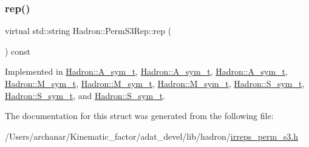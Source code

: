 \mbox{\label{structHadron_1_1PermS3Rep_a4f22ded21fbb16c6b7dc3d729090ef4f}} 
\subsubsection{\texorpdfstring{rep()}{rep()}\hspace{0.1cm}{\footnotesize\ttfamily [2/2]}}
{\footnotesize\ttfamily virtual std\+::string Hadron\+::\+Perm\+S3\+Rep\+::rep (\begin{DoxyParamCaption}{ }\end{DoxyParamCaption}) const\hspace{0.3cm}{\ttfamily [pure virtual]}}



Implemented in \mbox{\hyperlink{structHadron_1_1A__sym__t_ac60fe125eeb713995aafa4712e23f919}{Hadron\+::\+A\+\_\+sym\+\_\+t}}, \mbox{\hyperlink{structHadron_1_1A__sym__t_ac60fe125eeb713995aafa4712e23f919}{Hadron\+::\+A\+\_\+sym\+\_\+t}}, \mbox{\hyperlink{structHadron_1_1A__sym__t_ac60fe125eeb713995aafa4712e23f919}{Hadron\+::\+A\+\_\+sym\+\_\+t}}, \mbox{\hyperlink{structHadron_1_1M__sym__t_ad90bc816709bb65ec3e0b804090fbefe}{Hadron\+::\+M\+\_\+sym\+\_\+t}}, \mbox{\hyperlink{structHadron_1_1M__sym__t_ad90bc816709bb65ec3e0b804090fbefe}{Hadron\+::\+M\+\_\+sym\+\_\+t}}, \mbox{\hyperlink{structHadron_1_1M__sym__t_ad90bc816709bb65ec3e0b804090fbefe}{Hadron\+::\+M\+\_\+sym\+\_\+t}}, \mbox{\hyperlink{structHadron_1_1S__sym__t_a1a8ccb60f6d70c9a00b8683ad8eac195}{Hadron\+::\+S\+\_\+sym\+\_\+t}}, \mbox{\hyperlink{structHadron_1_1S__sym__t_a1a8ccb60f6d70c9a00b8683ad8eac195}{Hadron\+::\+S\+\_\+sym\+\_\+t}}, and \mbox{\hyperlink{structHadron_1_1S__sym__t_a1a8ccb60f6d70c9a00b8683ad8eac195}{Hadron\+::\+S\+\_\+sym\+\_\+t}}.



The documentation for this struct was generated from the following file\+:\begin{DoxyCompactItemize}
\item 
/\+Users/archanar/\+Kinematic\+\_\+factor/adat\+\_\+devel/lib/hadron/\mbox{\hyperlink{lib_2hadron_2irreps__perm__s3_8h}{irreps\+\_\+perm\+\_\+s3.\+h}}\end{DoxyCompactItemize}
